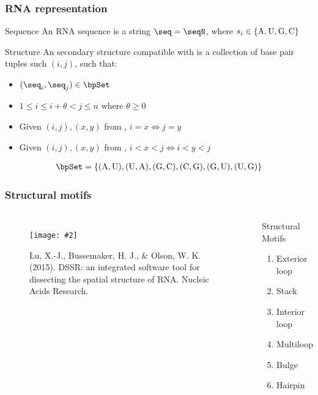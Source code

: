 \documentclass{beamer}
\newcommand{\slidefigure}[2][1]{\texttt{[image: \#2]}}
\begin{document}
\begin{frame}
  \frametitle{RNA representation}
  \begin{block}
    {Sequence} An RNA sequence is a string $\seq = \seqN$, where $s_i \in \{\text{A,\,U,\,G,\,C}\}$
  \end{block}
  \begin{block}
    {Structure} An secondary structure \str compatible with \seq is a collection of base pair tuples such $(i,j)$, such that:
    \begin{itemize}
      \item $(\seq_i, \seq_j) \in \bpSet$
      \item $1 \le i \le i+\theta < j \le n$ where $\theta \ge 0$
      \item Given $(i,j), (x,y)$ from \str, $i=x \iff j=y$
      \item Given $(i,j), (x,y)$ from \str, $i<x<j \iff i<y<j$
    \end{itemize}
  \end{block}
  \begin{align*}
    \bpSet = \{\text{(A,\,U),\,(U,\,A),\,(G,\,C),\,(C,\,G),\,(G,\,U),\,(U,\,G)}\}
  \end{align*}
\end{frame}

\begin{frame}
  \frametitle{Structural motifs}
  \begin{columns}
    \begin{figure}
      \centering
      \slidefigure{rnass}
      \caption{Lu, X.-J., Bussemaker, H. J., \& Olson, W. K. (2015). DSSR: an integrated software tool for dissecting the spatial structure of RNA. Nucleic Acids Research.}
    \end{figure}

    \begin{block}
      {Structural Motifs}
      \begin{enumerate}
        \item Exterior loop
        \item Stack
        \item Interior loop
        \item Multiloop
        \item Bulge
        \item Hairpin
      \end{enumerate}
    \end{block}
  \end{columns}
\end{frame}
\end{document}

